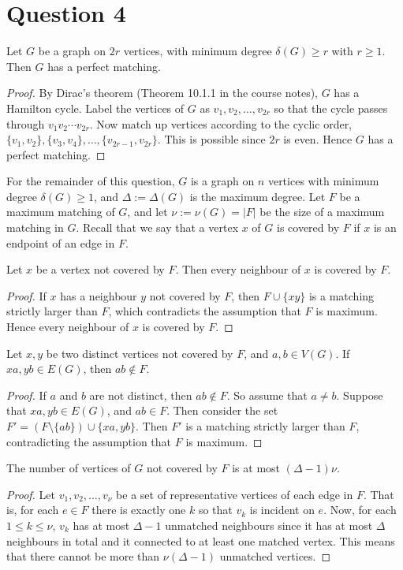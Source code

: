 \documentclass{unswmaths}
\begin{document}
\section{Question 4}
\begin{proposition}
\label{4a}
    Let $G$ be a graph on $2r$ vertices, with minimum degree $\delta(G) \geq r$
    with $r \geq 1$. Then $G$ has a perfect matching.
\end{proposition}
\begin{proof}
    By Dirac's theorem (Theorem 10.1.1 in the course notes), $G$ has a Hamilton cycle.
    Label the vertices of $G$ as $v_1,v_2,\ldots,v_{2r}$ so that the cycle
    passes through $v_1v_2\cdots v_{2r}$. Now match up vertices
    according to the cyclic order, $\{v_1,v_2\},\{v_3,v_4\},\ldots,\{v_{2r-1},v_{2r}\}$.
    This is possible since $2r$ is even. Hence $G$ has a perfect matching.
\end{proof}
For the remainder of this question, $G$ is a graph on $n$ vertices with minimum
degree $\delta(G) \geq 1$, and $\Delta := \Delta(G)$ is the maximum degree.
Let $F$ be a maximum matching of $G$, and let $\nu := \nu(G) = |F|$ be the size of
a maximum matching in $G$. Recall that we say that a vertex $x$ of $G$
is covered by $F$ if $x$ is an endpoint of an edge in $F$.
\begin{proposition}
\label{4b1}
    Let $x$ be a vertex not covered by $F$. Then every neighbour of $x$
    is covered by $F$.
\end{proposition}
\begin{proof}
    If $x$ has a neighbour $y$ not covered by $F$, then $F\cup\{xy\}$
    is a matching strictly larger than $F$, which contradicts the assumption
    that $F$ is maximum. Hence every neighbour of $x$ is covered by $F$.
\end{proof}
\begin{proposition}
\label{4b2}
    Let $x,y$ be two distinct vertices not covered by $F$, and $a,b \in V(G)$.
    If $xa,yb \in E(G)$, then $ab \notin F$.
\end{proposition}
\begin{proof}
    If $a$ and $b$ are not distinct, then $ab \notin F$. So assume that $a \neq b$.
    Suppose that $xa,yb \in E(G)$, and $ab \in F$. Then consider
    the set $F' = (F \setminus \{ab\})\cup \{xa,yb\}$. Then $F'$ is a matching
    strictly larger than $F$, contradicting the assumption that $F$ is maximum.
\end{proof} 

\begin{proposition}
\label{4b3}
The number of vertices of $G$ not covered by $F$ is at most $(\Delta-1)\nu$.
\end{proposition}
\begin{proof}
    Let $v_1,v_2,\ldots,v_\nu$ be a set of representative vertices
    of each edge in $F$. That is, for each $e \in F$ there
    is exactly one $k$ so that $v_k$ is incident on $e$. 
    Now, for each $1 \leq k \leq \nu$, $v_k$ has at most $\Delta - 1$
    unmatched neighbours since it has at most $\Delta$ neighbours in total
    and it connected to at least one matched vertex. This means that there cannot be more
    than $\nu(\Delta-1)$ unmatched vertices. 
\end{proof}
\end{document}
